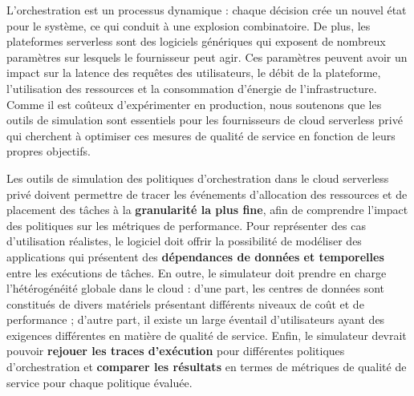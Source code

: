 L'orchestration est un processus dynamique : chaque décision crée un nouvel état pour le système, ce qui conduit à une explosion combinatoire. De plus, les plateformes serverless sont des logiciels génériques qui exposent de nombreux paramètres sur lesquels le fournisseur peut agir. Ces paramètres peuvent avoir un impact sur la latence des requêtes des utilisateurs, le débit de la plateforme, l'utilisation des ressources et la consommation d'énergie de l'infrastructure. Comme il est coûteux d'expérimenter en production, nous soutenons que les outils de simulation sont essentiels pour les fournisseurs de cloud serverless privé qui cherchent à optimiser ces mesures de qualité de service en fonction de leurs propres objectifs.

Les outils de simulation des politiques d'orchestration dans le cloud serverless privé doivent permettre de tracer les événements d'allocation des ressources et de placement des tâches à la \textbf{granularité la plus fine}, afin de comprendre l'impact des politiques sur les métriques de performance. Pour représenter des cas d'utilisation réalistes, le logiciel doit offrir la possibilité de modéliser des applications qui présentent des \textbf{dépendances de données et temporelles} entre les exécutions de tâches. En outre, le simulateur doit prendre en charge l'hétérogénéité globale dans le cloud : d'une part, les centres de données sont constitués de divers matériels présentant différents niveaux de coût et de performance ; d'autre part, il existe un large éventail d'utilisateurs ayant des exigences différentes en matière de qualité de service. Enfin, le simulateur devrait pouvoir \textbf{rejouer les traces d'exécution} pour différentes politiques d'orchestration et \textbf{comparer les résultats} en termes de métriques de qualité de service pour chaque politique évaluée.

